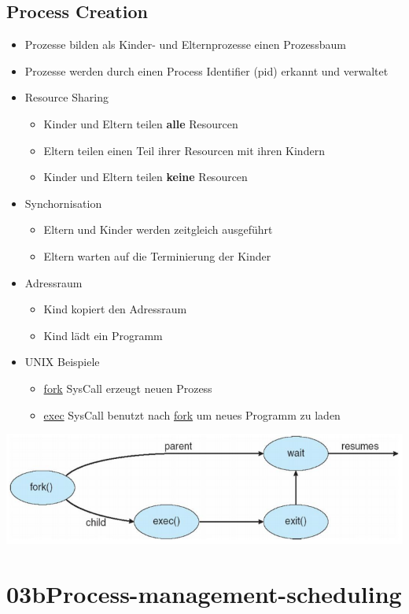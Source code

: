 \documentclass[a4paper]{scrreprt}
\begin{document}
\section{Process Creation}
	\begin{itemize}
		\item Prozesse bilden als Kinder- und Elternprozesse einen Prozessbaum
		\item Prozesse werden durch einen Process Identifier (pid) erkannt und verwaltet
		\item Resource Sharing
		\begin{itemize}
			\item Kinder und Eltern teilen \textbf{alle} Resourcen
			\item Eltern teilen einen Teil ihrer Resourcen mit ihren Kindern
			\item Kinder und Eltern teilen \textbf{keine} Resourcen
		\end{itemize}
		\item Synchornisation
		\begin{itemize}
			\item Eltern und Kinder werden zeitgleich ausgeführt
			\item Eltern warten auf die Terminierung der Kinder
		\end{itemize}
		\item Adressraum
		\begin{itemize}
			\item Kind kopiert den Adressraum
			\item Kind lädt ein Programm
		\end{itemize}
		\item UNIX Beispiele
		\begin{itemize}
			\item \underline{fork} SysCall erzeugt neuen Prozess
			\item \underline{exec} SysCall benutzt nach \underline{fork} um neues Programm zu laden
		\end{itemize}
	\end{itemize}
	\includegraphics[scale = 0.6]{process_fork.png}
\chapter{03bProcess-management-scheduling}
\end{document}
